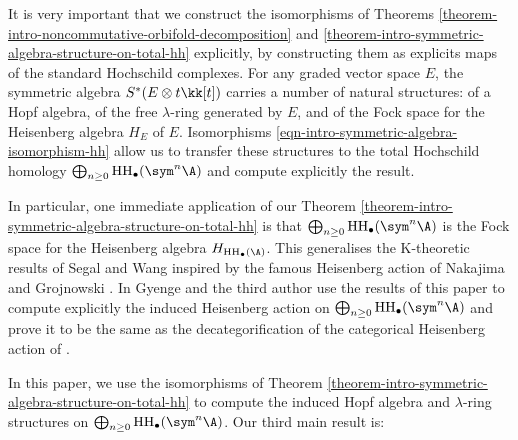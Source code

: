 \documentclass[12pt,a4paper,reqno]{amsart}
\DeclareMathOperator{\hochhom}{{HH}}
\begin{document}
It is very important that we construct the isomorphisms 
of Theorems 
\ref{theorem-intro-noncommutative-orbifold-decomposition}
and \ref{theorem-intro-symmetric-algebra-structure-on-total-hh} 
explicitly, by constructing them as explicits maps of the standard
Hochschild complexes. For any graded vector space $E$, the symmetric
algebra $S^*(E \otimes t \kk[t])$ carries a number of natural 
structures: of a Hopf algebra, of the free $\lambda$-ring generated by $E$,
and of the Fock space for the Heisenberg algebra $H_{E}$ of $E$.  
Isomorphisms \eqref{eqn-intro-symmetric-algebra-isomorphism-hh}
allow us to transfer these structures to the total Hochschild homology 
$\bigoplus_{n \geq 0} \hochhom_\bullet(\sym^n \A)$ and compute
explicitly the result. 

In particular, one immediate application of our Theorem 
\ref{theorem-intro-symmetric-algebra-structure-on-total-hh}
is that $\bigoplus_{n \geq 0} \hochhom_\bullet(\sym^n \A)$  
is the Fock space for the Heisenberg algebra
$H_{\hochhom_\bullet(\A)}$. This generalises
the K-theoretic results of Segal
\cite{Segal-EquivariantKTheoryAndSymmetricProducts} and Wang
\cite{Wang-EquivariantKTheoryWreathProductsAndHeisenbergAlgebra}
inspired by the famous Heisenberg action of Nakajima 
\cite{Nakajima-HeisenbergAlgebraAndHilbertSchemesOfPointsOnProjectiveSurfaces}
and Grojnowski
\cite{Grojnowski-InstantonsAndAffineAlgebrasITheHilbertSchemeAndVertexOperators}.
In \cite{GyengeLogvinenko-TheHeisenbergAlgebraOfAVectorSpaceAndHochschildHomology}
Gyenge and the third author use the results of this paper
to compute explicitly the induced Heisenberg action on
$\bigoplus_{n \geq 0} \hochhom_\bullet(\sym^n \A)$
and prove it to be the same as the decategorification of the categorical
Heisenberg action of
\cite{GyengeKoppensteinerLogvinenko-TheHeisenbergCategoryOfACategory}.  

In this paper, we use the isomorphisms of Theorem 
\ref{theorem-intro-symmetric-algebra-structure-on-total-hh}
to compute the induced Hopf algebra and $\lambda$-ring structures on 
$\bigoplus_{n \geq 0} \hochhom_\bullet(\sym^n \A)$. 
Our third main result is:
\end{document}
